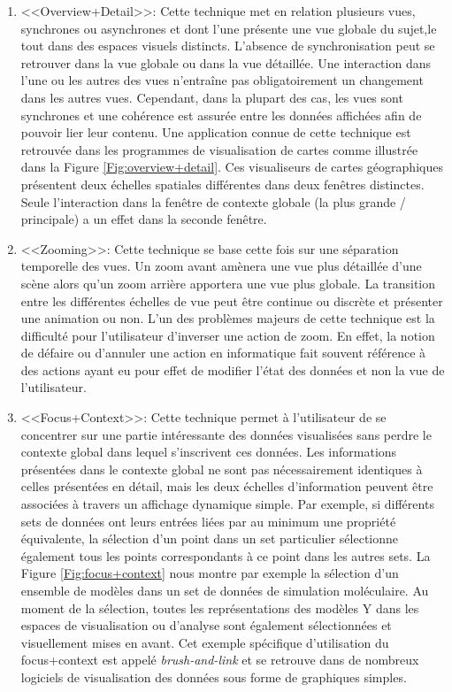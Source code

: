 \begin{enumerate}
    \item <<Overview+Detail>>: Cette technique met en relation plusieurs vues, synchrones ou asynchrones et dont l'une présente une vue globale du sujet,le tout dans des espaces visuels distincts. L'absence de synchronisation peut se retrouver dans la vue globale ou dans la vue détaillée. Une interaction dans l'une ou les autres des vues n'entraîne pas obligatoirement un changement dans les autres vues. Cependant, dans la plupart des cas, les vues sont synchrones et une cohérence est assurée entre les données affichées afin de pouvoir lier leur contenu. Une application connue de cette technique est retrouvée dans les programmes de visualisation de cartes comme illustrée dans la Figure \ref{Fig:overview+detail}. Ces visualiseurs de cartes géographiques présentent deux échelles spatiales différentes dans deux fenêtres distinctes. Seule l'interaction dans la fenêtre de contexte globale (la plus grande / principale) a un effet dans la seconde fenêtre.
    \item <<Zooming>>: Cette technique se base cette fois sur une séparation temporelle des vues. Un zoom avant amènera une vue plus détaillée d'une scène alors qu'un zoom arrière apportera une vue plus globale. La transition entre les différentes échelles de vue peut être continue ou discrète et présenter une animation ou non. L'un des problèmes majeurs de cette technique est la difficulté pour l'utilisateur d'inverser une action de zoom. En effet, la notion de défaire ou d'annuler une action en informatique fait souvent référence à des actions ayant eu pour effet de modifier l'état des données et non la vue de l'utilisateur.
    \item <<Focus+Context>>: Cette technique permet à l'utilisateur de se concentrer sur une partie intéressante des données visualisées sans perdre le contexte global dans lequel s'inscrivent ces données. Les informations présentées dans le contexte global ne sont pas nécessairement identiques à celles présentées en détail, mais les deux échelles d'information peuvent être associées à travers un affichage dynamique simple. Par exemple, si différents sets de données ont leurs entrées liées par au minimum une propriété équivalente, la sélection d'un point dans un set particulier sélectionne également tous les points correspondants à ce point dans les autres sets. La Figure \ref{Fig:focus+context} nous montre par exemple la sélection d'un ensemble de modèles dans un set de données de simulation moléculaire. Au moment de la sélection, toutes les représentations des modèles Y dans les espaces de visualisation ou d'analyse sont également sélectionnées et visuellement mises en avant. Cet exemple spécifique d'utilisation du focus+context est appelé \textit{brush-and-link} et se retrouve dans de nombreux logiciels de visualisation des données sous forme de graphiques simples.

\end{enumerate}
